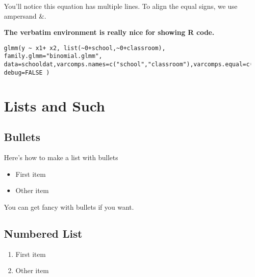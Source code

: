 \documentclass{article}
\begin{document}
You'll notice this equation has multiple lines. To align the equal signs, we use  ampersand \&. 

\textbf{The verbatim environment is really nice for showing R code.}
\begin{verbatim}
glmm(y ~ x1+ x2, list(~0+school,~0+classroom),  family.glmm="binomial.glmm", 
data=schooldat,varcomps.names=c("school","classroom"),varcomps.equal=c(1,2),
debug=FALSE )
 \end{verbatim}





\section{Lists and Such} \label{sec:lists}


\subsection{Bullets}\label{sec:bullets}
Here's how to make a list with bullets

\begin{itemize}

\item First item
\item Other item
\end{itemize}

You can get fancy with bullets if you want.

\subsection{Numbered List}

\begin{enumerate}

\item First item
\item Other item
\end{enumerate}
\end{document}
